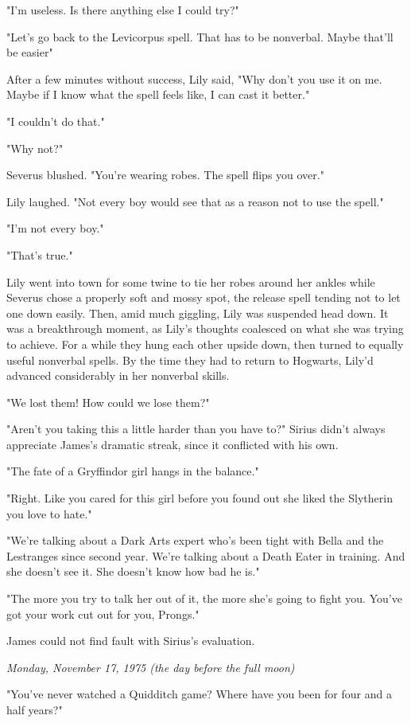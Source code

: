 \documentclass[a4paper,11pt]{article}
\begin{document}
"I'm useless. Is there anything else I could try?"

"Let's go back to the Levicorpus spell. That has to be nonverbal. Maybe that'll be easier"

After a few minutes without success, Lily said, "Why don't you use it on me. Maybe if I know what the spell feels like, I can cast it better."

"I couldn't do that."

"Why not?"

Severus blushed. "You're wearing robes. The spell flips you over."

Lily laughed. "Not every boy would see that as a reason not to use the spell."

"I'm not every boy."

"That's true."

Lily went into town for some twine to tie her robes around her ankles while Severus chose a properly soft and mossy spot, the release spell tending not to let one down easily. Then, amid much giggling, Lily was suspended head down. It was a breakthrough moment, as Lily's thoughts coalesced on what she was trying to achieve. For a while they hung each other upside down, then turned to equally useful nonverbal spells. By the time they had to return to Hogwarts, Lily'd advanced considerably in her nonverbal skills.

"We lost them! How could we lose them?"

"Aren't you taking this a little harder than you have to?" Sirius didn't always appreciate James's dramatic streak, since it conflicted with his own.

"The fate of a Gryffindor girl hangs in the balance."

"Right. Like you cared for this girl before you found out she liked the Slytherin you love to hate."

"We're talking about a Dark Arts expert who's been tight with Bella and the Lestranges since second year. We're talking about a Death Eater in training. And she doesn't see it. She doesn't know how bad he is."

"The more you try to talk her out of it, the more she's going to fight you. You've got your work cut out for you, Prongs."

James could not find fault with Sirius's evaluation.

\emph{Monday, November 17, 1975 (the day before the full moon)}

"You've never watched a Quidditch game? Where have you been for four and a half years?"
\end{document}
